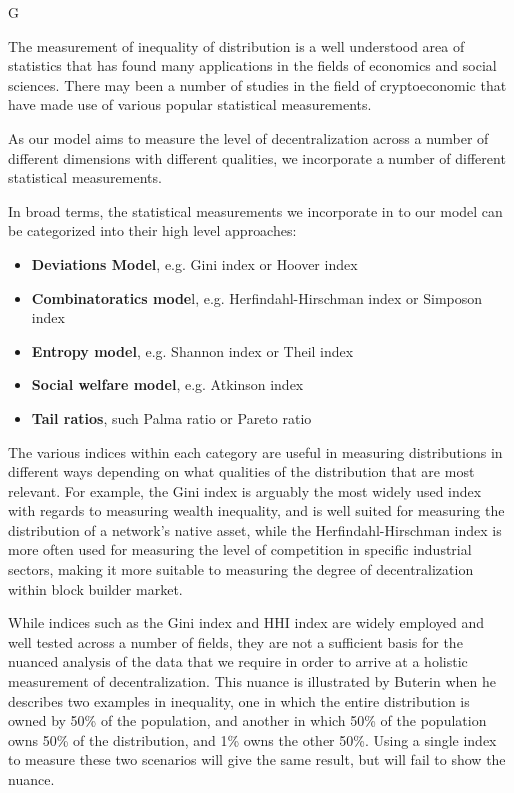 G\documentclass[conference]{IEEEtran}
\begin{document}
The measurement of inequality of distribution is a well understood area of statistics that has found many applications in the fields of economics and social sciences. There may been a number of studies in the field of cryptoeconomic that have made use of various popular statistical measurements.

As our model aims to measure the level of decentralization across a number of different dimensions with different qualities, we incorporate a number of different statistical measurements.

In broad terms, the statistical measurements we incorporate in to our model can be categorized into their high level approaches:

\begin{itemize}
    \item \textbf{Deviations Model}, e.g. Gini index or Hoover index
    \item \textbf{Combinatoratics mode}l, e.g. Herfindahl-Hirschman index or Simposon index
    \item \textbf{Entropy model}, e.g. Shannon index or Theil index
    \item \textbf{Social welfare model}, e.g. Atkinson index
    \item \textbf{Tail ratios}, such Palma ratio or Pareto ratio
\end{itemize}

The various indices within each category are useful in measuring distributions in different ways depending on what qualities of the distribution that are most relevant.  For example, the Gini index is arguably the most widely used index with regards to measuring wealth inequality, and is well suited for measuring the distribution of a network's native asset, while the Herfindahl-Hirschman index is more often used for measuring the level of competition in specific industrial sectors, making it more suitable to measuring the degree of decentralization within block builder market.

While indices such as the Gini index and HHI index are widely employed and well tested across a number of fields, they are not a sufficient basis for the nuanced analysis of the data that we require in order to arrive at a holistic measurement of decentralization.  This nuance is illustrated by Buterin \cite{buterin2022b} when he describes two examples in inequality, one in which the entire distribution is owned by 50\% of the population, and another in which 50\% of the population owns 50\% of the distribution, and 1\% owns the other 50\%.  Using a single index to measure these two scenarios will give the same result, but will fail to show the nuance.
\end{document}
